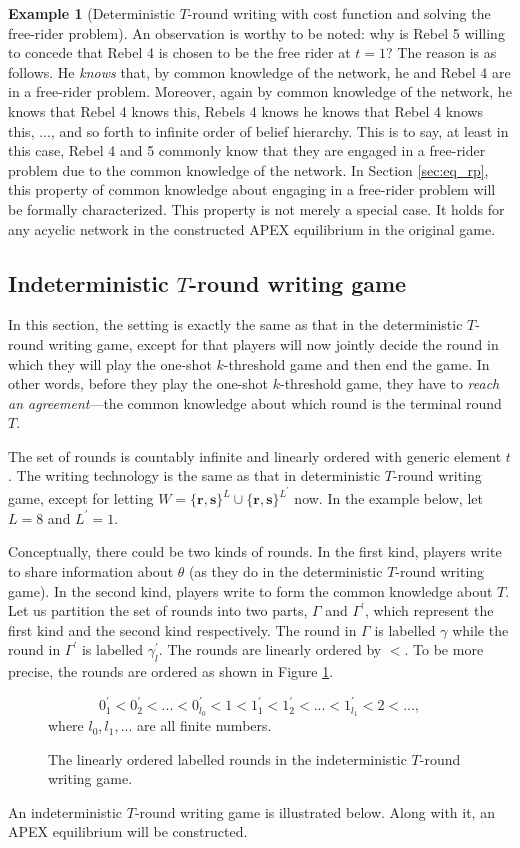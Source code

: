 \documentclass[12pt,letter]{article}
\theoremstyle{definition}
\newtheorem{example}{Example}
\theoremstyle{remark}
\theoremstyle{claim}
\begin{document}
\begin{example}[Deterministic $T$-round writing with cost function and solving the free-rider problem]
An observation is worthy to be noted: why is Rebel 5 willing to concede that Rebel 4 is chosen to be the free rider at $t=1$? The reason is as follows. He \textit{knows} that, by common knowledge of the network, he and Rebel 4 are in a free-rider problem. Moreover, again by common knowledge of the network, he knows that Rebel 4 knows this, Rebels 4 knows he knows that Rebel 4 knows this, ..., and so forth to infinite order of belief hierarchy. This is to say, at least in this case, Rebel 4 and 5 commonly know that they are engaged in a free-rider problem due to the common knowledge of the network. In Section \ref{sec:eq_rp}, this property of common knowledge about engaging in a free-rider problem will be formally characterized. This property is not merely a special case. It holds for any acyclic network in the constructed APEX equilibrium in the original game.  

\end{example}


\subsection{Indeterministic $T$-round writing game}
\label{sec:indem_writing}
In this section, the setting is exactly the same as that in the deterministic $T$-round writing game, except for that players will now jointly decide the round in which they will play the one-shot $k$-threshold game and then end the game. In other words, before they play the one-shot $k$-threshold game, they have to \textit{reach an agreement}---the common knowledge about which round is the terminal round ${T}$. 

The set of rounds is countably infinite and linearly ordered with generic element $t$. The writing technology is the same as that in deterministic $T$-round writing game, except for letting $W=\{\textbf{r},\textbf{s}\}^L\cup \{\textbf{r},\textbf{s}\}^{L^{'}}$ now. In the example below, let $L=8$ and $L^{'}=1$. 

Conceptually, there could be two kinds of rounds. In the first kind, players write to share information about $\theta$ (as they do in the deterministic $T$-round writing game). In the second kind, players write to form the common knowledge about ${T}$. Let us partition the set of rounds into two parts, $\Gamma$ and $\Gamma^{'}$, which represent the first kind and the second kind respectively. The round in $\Gamma$ is labelled $\gamma$ while the round in $\Gamma^{'}$ is labelled $\gamma^{'}_l$. The rounds are linearly ordered by $<$. To be more precise, the rounds are ordered as shown in Figure \ref{fig:ordered_writing}.
\begin{figure}
\caption{The linearly ordered labelled rounds in the indeterministic $T$-round writing game.}
\label{fig:ordered_writing}
\[0^{'}_1<0^{'}_2<...<0^{'}_{l_0}<1<1^{'}_{1}<1^{'}_{2}<...<1^{'}_{l_1}<2<...,\]
where $l_0,l_1,...$ are all finite numbers.

\end{figure}
An indeterministic $T$-round writing game is illustrated below. Along with it, an APEX equilibrium will be constructed. 
\end{document}
